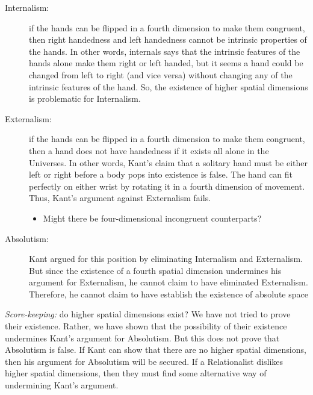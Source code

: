 \documentclass[oneside]{article}
\begin{document}
\begin{description}
\item[Internalism:]  if the hands can be flipped in a fourth dimension to make them congruent, then right handedness and left handedness cannot be intrinsic properties of the  hands. In other words, internals says that the intrinsic features of the hands alone make  them right or left handed, but it seems a hand could be changed from left to right (and vice versa) without changing any of the intrinsic features of the hand. So, the existence of higher spatial dimensions is problematic for Internalism.
\item[Externalism:] if the hands can be flipped in a fourth dimension to make them congruent, then 
a hand does not have handedness if it exists all alone in the Universes. In other words, Kant's claim that a solitary hand must be either left or right before a body pops into existence is false. The hand can fit perfectly on either wrist by rotating it in a fourth dimension of movement. Thus, Kant's argument against Externalism fails. 
\begin{itemize}
\item Might there be four-dimensional incongruent counterparts? 
\end{itemize}
\item[Absolutism:] Kant argued for this position by eliminating Internalism and Externalism. But since the existence of a fourth spatial dimension undermines his argument for Externalism, he cannot claim to have eliminated Externalism. Therefore, he cannot claim to have establish the existence of absolute space 
\end{description}

\noindent \emph{Score-keeping:} do higher spatial dimensions exist? We have not tried to prove their existence. Rather, we have shown that the possibility of their existence undermines Kant's argument for Absolutism. But this does not prove that Absolutism is false. If Kant can show that there are no higher spatial dimensions, then his argument for Absolutism will be secured. If a Relationalist dislikes higher spatial dimensions, then they must find some alternative way of undermining Kant's argument. 
\end{document}
